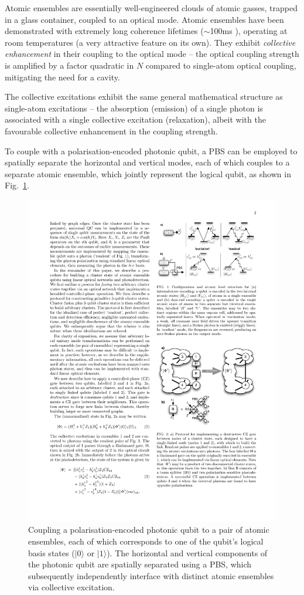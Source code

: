 \documentclass[aps, rmp, twocolumn, amsmath, amssymb, nofootinbib, superscriptaddress, longbibliography, floatfix, table-of-contents, eqsecnum]{revtex4-1}
\newcommand{\ket}[1]{|#1\rangle}
\newcommand{\comment}[1]{{\color{blue}{\textbf{#1}}}}
\begin{document}
Atomic ensembles are essentially well-engineered clouds of atomic gasses, trapped in a glass container, coupled to an optical mode. Atomic ensembles have been demonstrated with extremely long coherence lifetimes ($\sim$100ms \comment{Check this!}), operating at room temperatures (a very attractive feature on its own). They exhibit \textit{collective enhancement} in their coupling to the optical mode -- the optical coupling strength is amplified by a factor quadratic in $N$ compared to single-atom optical coupling, mitigating the need for a cavity.

The collective excitations exhibit the same general mathematical structure as single-atom excitations -- the absorption (emission) of a single photon is associated with a single collective excitation (relaxation), albeit with the favourable collective enhancement in the coupling strength.

To couple with a polarisation-encoded photonic qubit, a PBS can be employed to spatially separate the horizontal and vertical modes, each of which couples to a separate atomic ensemble, which jointly represent the logical qubit, as shown in Fig.~\ref{fig:atomic_ensemble_qubit}.

\begin{figure}[!htb]
\includegraphics[width=0.45\columnwidth]{atomic_ensemble_qubit}
\caption{Coupling a polarisation-encoded photonic qubit to a pair of atomic ensembles, each of which corresponds to one of the qubit's logical basis states ($\ket{0}$ or $\ket{1}$). The horizontal and vertical components of the photonic qubit are spatially separated using a PBS, which subsequently independently interface with distinct atomic ensembles via collective excitation.} \label{fig:atomic_ensemble_qubit}
\end{figure}
\end{document}
